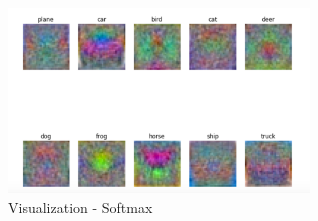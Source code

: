 \documentclass[12pt]{article}
\begin{document}
	\begin{figure}[!tpb]
		\centerline{\includegraphics[width=80mm]{CIFAR-10.png}}
		\caption{\label{Fig5}
			Visualization - Softmax}
	\end{figure}
\end{document}
